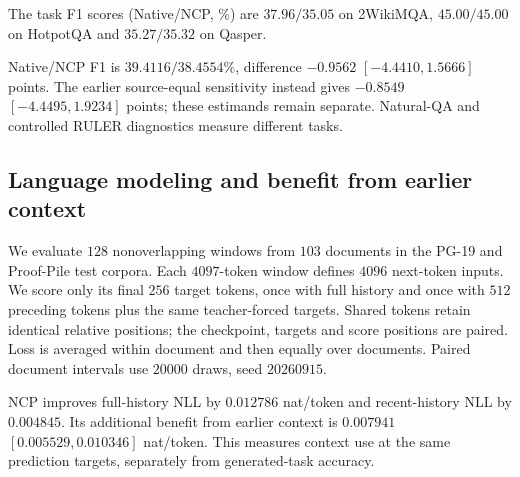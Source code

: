 The task F1 scores (Native/NCP, \%) are $37.96/35.05$ on 2WikiMQA,
$45.00/45.00$ on HotpotQA and $35.27/35.32$ on Qasper.

Native/NCP F1 is $39.4116/38.4554\%$, difference
$-0.9562$ $[-4.4410,1.5666]$ points. The earlier source-equal sensitivity
instead gives $-0.8549$ $[-4.4495,1.9234]$ points; these estimands remain
separate. Natural-QA and controlled RULER diagnostics measure different tasks.

\subsection{Language modeling and benefit from earlier context}
\label{sec:ncp-context-new}
We evaluate $128$ nonoverlapping windows from $103$ documents in the
PG-19 and Proof-Pile test corpora. Each $4097$-token window
defines $4096$ next-token inputs. We score only its final $256$ target tokens,
once with full history and once with $512$ preceding tokens plus the same
teacher-forced targets. Shared tokens retain identical relative positions;
the checkpoint, targets and score positions are paired. Loss is averaged
within document and then equally over documents. Paired document intervals
use $20000$ draws, seed $20260915$.



NCP improves full-history NLL by $0.012786$ nat/token and recent-history NLL
by $0.004845$. Its additional benefit from earlier context is $0.007941$
$[0.005529,0.010346]$ nat/token. This measures context use at the same prediction
targets, separately from generated-task accuracy.
\FloatBarrier
